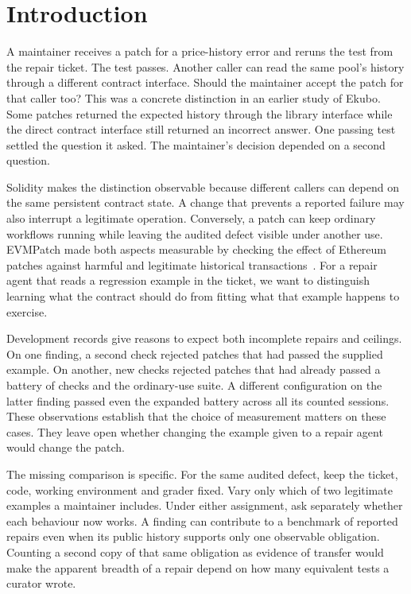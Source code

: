 \section{Introduction}
A maintainer receives a patch for a price-history error and reruns the test from the repair ticket. The test passes. Another caller can read the same pool's history through a different contract interface. Should the maintainer accept the patch for that caller too? This was a concrete distinction in an earlier study of Ekubo. Some patches returned the expected history through the library interface while the direct contract interface still returned an incorrect answer. One passing test settled the question it asked. The maintainer's decision depended on a second question.

Solidity makes the distinction observable because different callers can depend on the same persistent contract state. A change that prevents a reported failure may also interrupt a legitimate operation. Conversely, a patch can keep ordinary workflows running while leaving the audited defect visible under another use. EVMPatch made both aspects measurable by checking the effect of Ethereum patches against harmful and legitimate historical transactions~\cite{rodler2021evmpatch}. For a repair agent that reads a regression example in the ticket, we want to distinguish learning what the contract should do from fitting what that example happens to exercise.

Development records give reasons to expect both incomplete repairs and ceilings. On one finding, a second check rejected patches that had passed the supplied example. On another, new checks rejected patches that had already passed a battery of checks and the ordinary-use suite. A different configuration on the latter finding passed even the expanded battery across all its counted sessions. These observations establish that the choice of measurement matters on these cases. They leave open whether changing the example given to a repair agent would change the patch.

The missing comparison is specific. For the same audited defect, keep the ticket, code, working environment and grader fixed. Vary only which of two legitimate examples a maintainer includes. Under either assignment, ask separately whether each behaviour now works. A finding can contribute to a benchmark of reported repairs even when its public history supports only one observable obligation. Counting a second copy of that same obligation as evidence of transfer would make the apparent breadth of a repair depend on how many equivalent tests a curator wrote.

